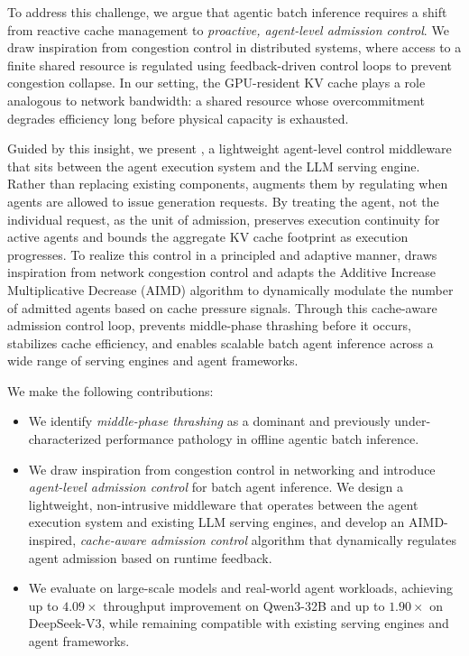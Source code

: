 To address this challenge, we argue that agentic batch inference requires a shift from reactive cache management to \emph{proactive, agent-level admission control}.
We draw inspiration from congestion control \cite{congestion_control,chiu1989analysis,tcp} in distributed systems, where access to a finite shared resource is regulated using feedback-driven control loops to prevent congestion collapse.
In our setting, the GPU-resident KV cache plays a role analogous to network bandwidth: a shared resource whose overcommitment degrades efficiency long before physical capacity is exhausted.

Guided by this insight, we present \SysName{}, a lightweight agent-level control middleware that sits between the agent execution system and the LLM serving engine.
Rather than replacing existing components, \SysName{} augments them by regulating when agents are allowed to issue generation requests. By treating the agent, not the individual request, as the unit of admission, \SysName{} preserves execution continuity for active agents and bounds the aggregate KV cache footprint as execution progresses. To realize this control in a principled and adaptive manner, \SysName{} draws inspiration from network congestion control and adapts the Additive Increase Multiplicative Decrease (AIMD) algorithm \cite{AIMD1} to dynamically modulate the number of admitted agents based on cache pressure signals.
Through this cache-aware admission control loop, \SysName{} prevents middle-phase thrashing before it occurs, stabilizes cache efficiency, and enables scalable batch agent inference across a wide range of serving engines and agent frameworks.

We make the following contributions:
\begin{itemize}[leftmargin=*, itemsep=0pt, topsep=5pt]
    \item We identify \emph{middle-phase thrashing} as a dominant and previously under-characterized performance pathology in offline agentic batch inference.
    
    \item We draw inspiration from congestion control in networking and introduce \emph{agent-level admission control} for batch agent inference.
    We design a lightweight, non-intrusive middleware that operates between the agent execution system and existing LLM serving engines, and develop an AIMD-inspired, \emph{cache-aware admission control} algorithm that dynamically regulates agent admission based on runtime feedback.
    
    \item We evaluate \SysName{} on large-scale models and real-world agent workloads, achieving up to $4.09\times$ throughput improvement on Qwen3-32B and up to $1.90\times$ on DeepSeek-V3, while remaining compatible with existing serving engines and agent frameworks.
\end{itemize}




